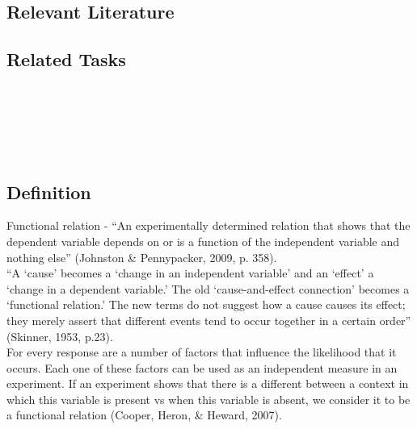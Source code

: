 \subsection{Relevant Literature}
\begin{refsection}
\nocite{test,alang2017police,clayton2018black}
\printbibliography[heading=none]
\end{refsection}
%
\subsection{Related Tasks}
\fourFKFourteen{}\\
\fourFKTwentyFour{}\\
\fourFKThirtyTwo{}\\
\fourFKThirtySix{}\\
%
%
%
%
%
%
\section{\fourFKThirtyThree{}}
\subsection{Definition}
Functional relation - ``An experimentally determined relation that shows that the dependent variable depends on or is a function of the independent variable and nothing else'' (Johnston \& Pennypacker, 2009, p. 358).\\

``A `cause' becomes a ‘change in an independent variable' and an `effect' a `change in a dependent variable.' The old ‘cause-and-effect connection' becomes a ‘functional relation.' The new terms do not suggest how a cause causes its effect; they merely assert that different events tend to occur together in a certain order'' (Skinner, 1953, p.23).\\

For every response are a number of factors that influence the likelihood that it occurs. Each one of these factors can be used as an independent measure in an experiment. If an experiment shows that there is a different between a context in which this variable is present vs when this variable is absent, we consider it to be a functional relation (Cooper, Heron, \& Heward, 2007).\\

